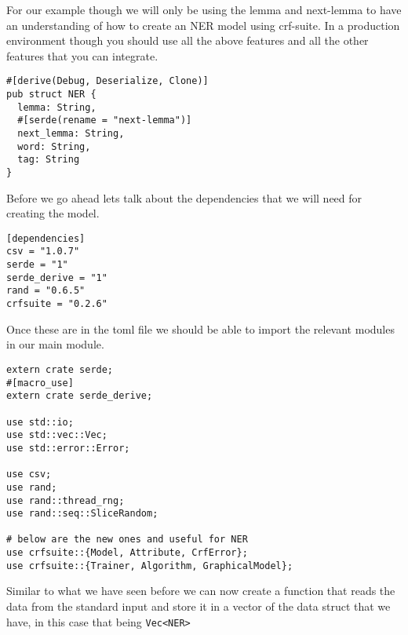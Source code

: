 \documentclass{book}
\begin{document}
For our example though we will only be using the lemma and next-lemma to have an understanding of how to create an NER model using crf-suite. In a production environment though you should use all the above features and all the other features that you can integrate.

\begin{lstlisting}[caption={chapter5\\/crfsuite\\-model\\/src\\/main\\.rs}, basicstyle=\small]
#[derive(Debug, Deserialize, Clone)]
pub struct NER {
  lemma: String,
  #[serde(rename = "next-lemma")]
  next_lemma: String,
  word: String,
  tag: String
}
\end{lstlisting}

Before we go ahead lets talk about the dependencies that we will need for creating the model.

\begin{lstlisting}[caption={chapter5\\/crfsuite\\-model\\/Cargo\\.toml}, basicstyle=\small]
[dependencies]
csv = "1.0.7"
serde = "1"
serde_derive = "1"
rand = "0.6.5"
crfsuite = "0.2.6"
\end{lstlisting}

Once these are in the toml file we should be able to import the relevant modules in our main module.

\begin{lstlisting}[caption={chapter5\\/crfsuite\\-model\\/src\\/main\\.rs}, basicstyle=\small]
extern crate serde;
#[macro_use]
extern crate serde_derive;

use std::io;
use std::vec::Vec;
use std::error::Error;

use csv;
use rand;
use rand::thread_rng;
use rand::seq::SliceRandom;

# below are the new ones and useful for NER
use crfsuite::{Model, Attribute, CrfError};
use crfsuite::{Trainer, Algorithm, GraphicalModel};
\end{lstlisting}

Similar to what we have seen before we can now create a function that reads the data from the standard input and store it in a vector of the data struct that we have, in this case that being \lstinline{Vec<NER>}
\end{document}
